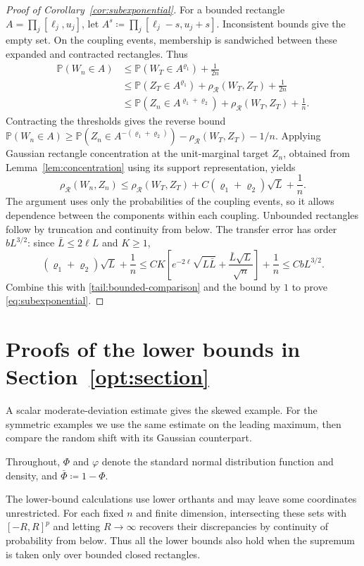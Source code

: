 \documentclass[11pt,letterpaper]{article}
\theoremstyle{remark}
\newcommand{\Pp}{\mathbb P}
\newcommand{\rh}{\rho_{\mathcal R}}
\begin{document}
\begin{proof}[Proof of Corollary~\ref{cor:subexponential}]
For a bounded rectangle \(A=\prod_j[\ell_j,u_j]\), let
\(A^s\coloneqq\prod_j[\ell_j-s,u_j+s]\). Inconsistent bounds
give the empty set. On the coupling events, membership is sandwiched
between these expanded and contracted rectangles. Thus
\begin{align*}
 \Pp(W_n\in A)
 &\le\Pp(W_T\in A^{\varrho_1})+\frac1{2n}\\
 &\le\Pp(Z_T\in A^{\varrho_1})+\rh(W_T,Z_T)+\frac1{2n}\\
 &\le\Pp(Z_n\in A^{\varrho_1+\varrho_2})+\rh(W_T,Z_T)+\frac1n.
\end{align*}
Contracting the thresholds gives the reverse bound
\(\Pp(W_n\in A)\ge\Pp(Z_n\in A^{-(\varrho_1+\varrho_2)})
-\rh(W_T,Z_T)-1/n\). Applying Gaussian rectangle concentration at
the unit-marginal target \(Z_n\), obtained from Lemma~\ref{lem:concentration}
using its support representation, yields
\begin{equation}
 \rh(W_n,Z_n)\le\rh(W_T,Z_T)
       +C(\varrho_1+\varrho_2)\sqrt L+\frac1n.
 \label{tail:transfer}
\end{equation}
The argument uses only the probabilities of the coupling events,
so it allows dependence between the components within each coupling. Unbounded
rectangles follow by truncation and continuity from below.
The transfer error has order \(bL^{3/2}\): since
\(\bar L\le2\ell L\) and \(K\ge1\),
\[
 (\varrho_1+\varrho_2)\sqrt L+\frac1n
 \le CK\left[e^{-2\ell}\sqrt{L\bar L}
                     +\frac{\bar L\sqrt L}{\sqrt n}\right]+\frac1n
 \le CbL^{3/2}.
\]
Combine this with \eqref{tail:bounded-comparison} and the bound by \(1\)
to prove \eqref{eq:subexponential}.

\end{proof}

\section{Proofs of the lower bounds in Section~\ref*{opt:section}}\label{app:sharpness-proofs}
A scalar moderate-deviation estimate gives the skewed example. For the
symmetric examples we use the same estimate on the leading maximum, then
compare the random shift with its Gaussian counterpart.

Throughout, \(\Phi\) and \(\varphi\) denote the
standard normal distribution function and density, and
\(\bar\Phi\coloneqq1-\Phi\).

The lower-bound calculations use lower orthants and may leave some
coordinates unrestricted. For each fixed \(n\) and finite dimension,
intersecting these sets with \([-R,R]^p\) and letting \(R\to\infty\)
recovers their discrepancies by continuity of probability from below.
Thus all the lower bounds also hold when the supremum is taken only
over bounded closed rectangles.
\end{document}
